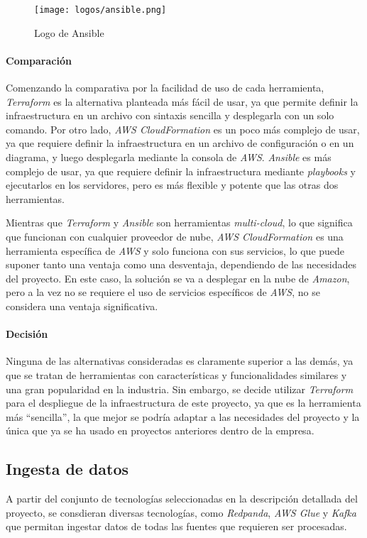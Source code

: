 \begin{figure}[H]
	\centering
	\texttt{[image: logos/ansible.png]}
	\caption{Logo de Ansible~\textregistered}
	\label{fig:ansible}
\end{figure}

\paragraph{Comparación}
Comenzando la comparativa por la facilidad de uso de cada herramienta,
\textit{Terraform} es la alternativa planteada más fácil de usar, ya que permite
definir la infraestructura en un archivo con sintaxis sencilla y desplegarla con
un solo comando. Por otro lado, \textit{AWS CloudFormation} es un poco más
complejo de usar, ya que requiere definir la infraestructura en un archivo de
configuración o en un diagrama, y luego desplegarla mediante la consola de
\textit{AWS}. \textit{Ansible} es más complejo de usar, ya que requiere definir
la infraestructura mediante \textit{playbooks} y ejecutarlos en los servidores,
pero es más flexible y potente que las otras dos herramientas.

Mientras que \textit{Terraform} y \textit{Ansible} son herramientas
\textit{multi-cloud}, lo que significa que funcionan con cualquier proveedor de
nube, \textit{AWS CloudFormation} es una herramienta específica de \textit{AWS}
y solo funciona con sus servicios, lo que puede suponer tanto una ventaja como
una desventaja, dependiendo de las necesidades del proyecto. En este caso, la
solución se va a desplegar en la nube de \textit{Amazon}, pero a la vez no se
requiere el uso de servicios específicos de \textit{AWS}, no se considera una
ventaja significativa.

\paragraph{Decisión}
Ninguna de las alternativas consideradas es claramente superior a las demás, ya
que se tratan de herramientas con características y funcionalidades similares y
una gran popularidad en la industria. Sin embargo, se decide utilizar
\textit{Terraform} para el despliegue de la infraestructura de este proyecto,
ya que es la herramienta más ``sencilla'', la que mejor se podría adaptar a las
necesidades del proyecto y la única que ya se ha usado en proyectos anteriores
dentro de la empresa.


\newpage{}
\subsection{Ingesta de datos}\label{subsec:alt_ingesta}
A partir del conjunto de tecnologías seleccionadas en la descripción detallada
del proyecto, se consdieran diversas tecnologías, como \textit{Redpanda},
\textit{AWS Glue} y \textit{Kafka} que permitan ingestar datos de todas las
fuentes que requieren ser procesadas.

